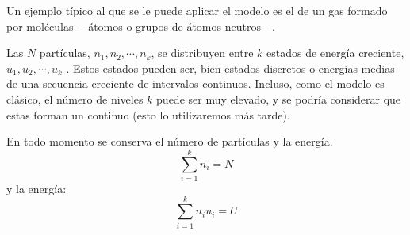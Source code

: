 Un ejemplo típico al que se le puede aplicar el modelo es el de un gas formado
por moléculas ---átomos o grupos de átomos neutros---.

Las $N$ partículas, $n_1, n_2, \cdots, n_k$, se distribuyen entre $k$ estados
de energía creciente,  $u_1, u_2, \cdots, u_k$ . Estos estados pueden ser,
bien estados discretos o energías medias de una secuencia creciente de
intervalos continuos. Incluso, como el modelo es clásico, el número de niveles
$k$ puede ser muy elevado, y se podría considerar que estas forman un
continuo (esto lo utilizaremos más tarde).

En todo momento se conserva el número de partículas y la energía.
\begin{equation}
  \sum_{i=1}^{k} n_i = N
\end{equation}
y la energía:
\begin{equation}
  \sum_{i=1}^{k} n_i u_i = U
\end{equation}












